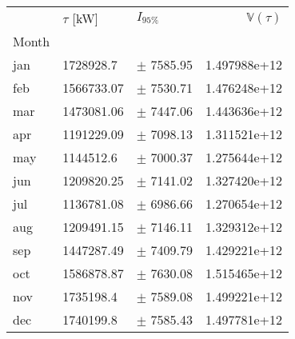 \begin{tabular}{lllr}
\toprule
{} & $\tau$ [kW] &      $I_{95\%}$ &  $\mathbb{V}(\tau)$  \\
Month &             &                 &                      \\
\midrule
jan   &   1728928.7 &   $\pm$ 7585.95 &         1.497988e+12 \\
feb   &  1566733.07 &   $\pm$ 7530.71 &         1.476248e+12 \\
mar   &  1473081.06 &   $\pm$ 7447.06 &         1.443636e+12 \\
apr   &  1191229.09 &   $\pm$ 7098.13 &         1.311521e+12 \\
may   &   1144512.6 &   $\pm$ 7000.37 &         1.275644e+12 \\
jun   &  1209820.25 &   $\pm$ 7141.02 &         1.327420e+12 \\
jul   &  1136781.08 &   $\pm$ 6986.66 &         1.270654e+12 \\
aug   &  1209491.15 &   $\pm$ 7146.11 &         1.329312e+12 \\
sep   &  1447287.49 &   $\pm$ 7409.79 &         1.429221e+12 \\
oct   &  1586878.87 &   $\pm$ 7630.08 &         1.515465e+12 \\
nov   &   1735198.4 &   $\pm$ 7589.08 &         1.499221e+12 \\
dec   &   1740199.8 &   $\pm$ 7585.43 &         1.497781e+12 \\
\bottomrule
\end{tabular}
